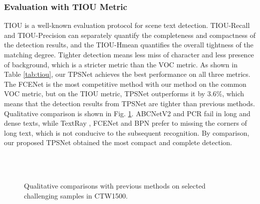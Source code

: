 \documentclass[sigconf]{acmart}
\begin{document}
	\subsubsection{Evaluation with TIOU Metric}
	TIOU \cite{liu2019tightness} is a well-known evaluation protocol for scene text detection. TIOU-Recall and TIOU-Precision can separately quantify the completeness and compactness of the detection results, and the TIOU-Hmean quantifies the overall tightness of the matching degree. Tighter detection means less miss of character and less presence of background, which is a stricter metric than the VOC metric. As shown in Table \ref{tab:tiou}, our TPSNet achieves the best performance on all three metrics. The FCENet \cite{zhu2021fourier} is the most competitive method with our method on the common VOC metric, but on the TIOU metric, TPSNet outperforms it by 3.6\%, which means that the detection results from TPSNet are tighter than previous methods.
	Qualitative comparison is shown in Fig. \ref{fig:quali}. ABCNetV2 \cite{Liu2020ABCNet} and PCR \cite{dai2021progressive} fail in long and dense texts, while TextRay \cite{Wang2020textray}, FCENet \cite{zhu2021fourier} and BPN \cite{zhang2021adaptive} prefer to missing the corners of long text, which is not conducive to the subsequent recognition. By comparison, our proposed TPSNet obtained the most compact and complete detection.
	
	\begin{figure}[t]
		\vspace{-0.15cm} 
		\centering
		\setlength{\abovecaptionskip}{5px}
		\subfigbottomskip=-3pt
		\subfigcapskip=-5pt
		\hspace{1.5pt}
		\vspace{-2pt}\\
		\hspace{1.5pt}
		\vspace{-2pt}\\
		\hspace{1.5pt}
		\caption{Qualitative comparisons with previous methods on selected challenging samples in CTW1500.}
		\label{fig:quali}
		\vspace{-13px}
	\end{figure}
	
\end{document}
